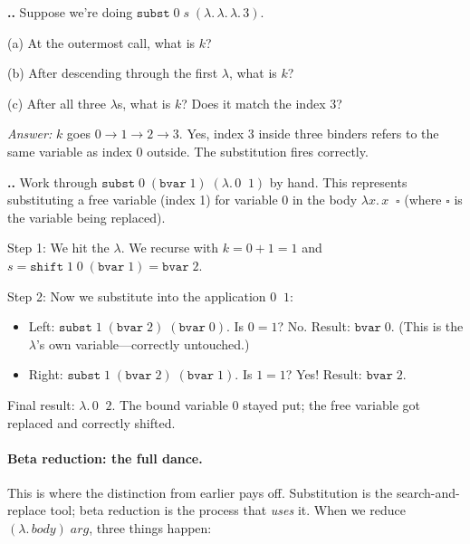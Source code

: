 \documentclass[11pt,a4paper]{article}
\newcounter{exercise}[section]
\renewcommand{\theexercise}{\thesection.\arabic{exercise}}
\theoremstyle{definition}
\newcommand{\lam}{\lambda}
\begin{document}
\begin{exercisebox}
\textbf{\theexercise.}\; Suppose we're doing $\texttt{subst}\;0\;s\;(\lam.\, \lam.\, \lam.\, 3)$.

(a) At the outermost call, what is $k$?

(b) After descending through the first $\lam$, what is $k$?

(c) After all three $\lam$s, what is $k$? Does it match the index $3$?

\emph{Answer:} $k$ goes $0 \to 1 \to 2 \to 3$. Yes, index $3$ inside three binders refers to the same variable as index $0$ outside. The substitution fires correctly.
\end{exercisebox}

\begin{exercisebox}
\textbf{\theexercise.}\; Work through $\texttt{subst}\;0\;(\texttt{bvar}\;1)\;(\lam.\, 0\;\;1)$ by hand. This represents substituting a free variable (index 1) for variable 0 in the body $\lam x.\, x\;\;\square$ (where $\square$ is the variable being replaced).

Step 1: We hit the $\lam$. We recurse with $k = 0 + 1 = 1$ and $s = \texttt{shift}\;1\;0\;(\texttt{bvar}\;1) = \texttt{bvar}\;2$.

Step 2: Now we substitute into the application $0\;\;1$:
\begin{itemize}[leftmargin=2em]
\item Left: $\texttt{subst}\;1\;(\texttt{bvar}\;2)\;(\texttt{bvar}\;0)$. Is $0 = 1$? No. Result: $\texttt{bvar}\;0$. (This is the $\lam$'s own variable---correctly untouched.)
\item Right: $\texttt{subst}\;1\;(\texttt{bvar}\;2)\;(\texttt{bvar}\;1)$. Is $1 = 1$? Yes! Result: $\texttt{bvar}\;2$.
\end{itemize}

Final result: $\lam.\, 0\;\;2$. The bound variable $0$ stayed put; the free
variable got replaced and correctly shifted.
\end{exercisebox}

\paragraph{Beta reduction: the full dance.}
This is where the distinction from earlier pays off. Substitution is the
search-and-replace tool; beta reduction is the process that \emph{uses} it.
When we reduce $(\lam.\,\mathit{body})\;\mathit{arg}$, three things happen:
\end{document}
